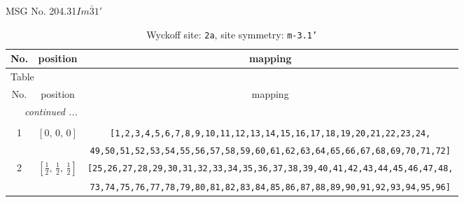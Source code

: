 \documentclass[fleqn,8pt]{jsarticle}
\begin{document}
\setcounter{MaxMatrixCols}{32}

\renewcommand{\tablename}{Table~}
\renewcommand{\figurename}{Figure~}
\begin{center}
\LARGE
MSG No. 204.31\quad$Im\bar{3}1'$
\end{center}
\renewcommand{\arraystretch}{1.2}
\begin{longtable}{ccc}
\caption{Wyckoff site: {\tt 2a}, site symmetry: {\tt m-3.1'}}
 \\
 \hline \hline
No. & position & mapping \\ \hline \endfirsthead

\multicolumn{2}{l}{\tablename\ \thetable{}} \\
 \hline \hline
No. & position & mapping \\ \hline \endhead

 \hline \hline
\multicolumn{2}{r}{\footnotesize\it continued ...} \\ \endfoot

 \hline \hline
\multicolumn{2}{r}{} \\ \endlastfoot

1 & $\left[ 0,\, 0,\, 0 \right]$ & {\tt [1,2,3,4,5,6,7,8,9,10,11,12,13,14,15,16,17,18,19,20,21,22,23,24,} \\ \hline
 &  & {\tt 49,50,51,52,53,54,55,56,57,58,59,60,61,62,63,64,65,66,67,68,69,70,71,72]} \\ \hline
2 & $\left[ \frac{1}{2},\, \frac{1}{2},\, \frac{1}{2} \right]$ & {\tt [25,26,27,28,29,30,31,32,33,34,35,36,37,38,39,40,41,42,43,44,45,46,47,48,} \\ \hline
 &  & {\tt 73,74,75,76,77,78,79,80,81,82,83,84,85,86,87,88,89,90,91,92,93,94,95,96]} \\
\end{longtable}
\renewcommand{\arraystretch}{1.2}
\end{document}
